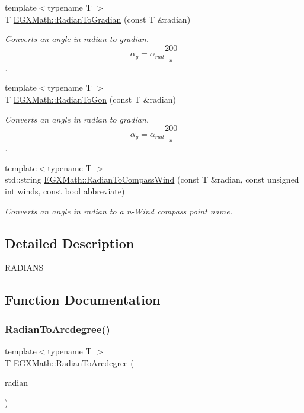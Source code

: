 \begin{DoxyCompactItemize}
{\footnotesize template$<$typename T $>$ }\\T \mbox{\hyperlink{group___e_g_x_math-_angle_conversions-_radian_ga3c1607eae50cbf0186c42485bb3878d5}{E\+G\+X\+Math\+::\+Radian\+To\+Gradian}} (const T \&radian)
\begin{DoxyCompactList}\small\item\em Converts an angle in radian to gradian. \[\alpha_{g}=\alpha_{rad}\frac{200}{\pi}\]. \end{DoxyCompactList}\item 
{\footnotesize template$<$typename T $>$ }\\T \mbox{\hyperlink{group___e_g_x_math-_angle_conversions-_radian_ga36912e5a810b64c271c4dafc17f4ca45}{E\+G\+X\+Math\+::\+Radian\+To\+Gon}} (const T \&radian)
\begin{DoxyCompactList}\small\item\em Converts an angle in radian to gradian. \[\alpha_{g}=\alpha_{rad}\frac{200}{\pi}\]. \end{DoxyCompactList}\item 
{\footnotesize template$<$typename T $>$ }\\std\+::string \mbox{\hyperlink{group___e_g_x_math-_angle_conversions-_radian_ga4d845b171148481aa7e85018d6dad035}{E\+G\+X\+Math\+::\+Radian\+To\+Compass\+Wind}} (const T \&radian, const unsigned int winds, const bool abbreviate)
\begin{DoxyCompactList}\small\item\em Converts an angle in radian to a n-\/\+Wind compass point name. \end{DoxyCompactList}\end{DoxyCompactItemize}


\subsection{Detailed Description}
R\+A\+D\+I\+A\+NS 

\subsection{Function Documentation}
\mbox{\label{group___e_g_x_math-_angle_conversions-_radian_ga3dfdc97357cc07f8379976bbc08f9852}} 
\subsubsection{\texorpdfstring{Radian\+To\+Arcdegree()}{RadianToArcdegree()}}
{\footnotesize\ttfamily template$<$typename T $>$ \\
T E\+G\+X\+Math\+::\+Radian\+To\+Arcdegree (\begin{DoxyParamCaption}\item[{const T \&}]{radian }\end{DoxyParamCaption})}



